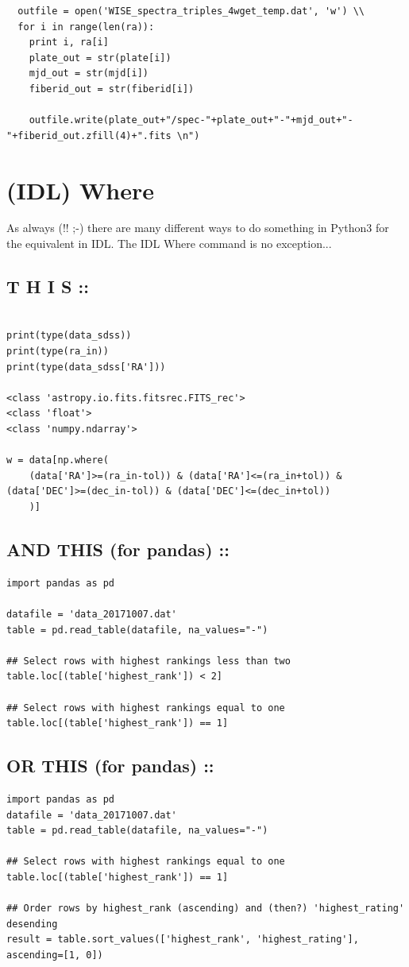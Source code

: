 \documentclass[11pt,a4paper]{article}
\begin{document}
\begin{lstlisting}
  outfile = open('WISE_spectra_triples_4wget_temp.dat', 'w') \\
  for i in range(len(ra)): 
    print i, ra[i] 
    plate_out = str(plate[i])
    mjd_out = str(mjd[i]) 
    fiberid_out = str(fiberid[i])

    outfile.write(plate_out+"/spec-"+plate_out+"-"+mjd_out+"-"+fiberid_out.zfill(4)+".fits \n")
\end{lstlisting}



\newpage
\section{(IDL) Where}
As always (!! ;-) there are many different ways to do something in
Python3 for the equivalent in IDL. The IDL Where command is no
exception...

\subsection{\bf  T H I S ::}
\begin{lstlisting}

print(type(data_sdss))
print(type(ra_in))
print(type(data_sdss['RA']))

<class 'astropy.io.fits.fitsrec.FITS_rec'>
<class 'float'>
<class 'numpy.ndarray'>

w = data[np.where(
    (data['RA']>=(ra_in-tol)) & (data['RA']<=(ra_in+tol)) & (data['DEC']>=(dec_in-tol)) & (data['DEC']<=(dec_in+tol))
    )]
\end{lstlisting}

\subsection{\bf  AND THIS  (for pandas)  ::}
\begin{lstlisting}
import pandas as pd

datafile = 'data_20171007.dat'
table = pd.read_table(datafile, na_values="-")

## Select rows with highest rankings less than two
table.loc[(table['highest_rank']) < 2]

## Select rows with highest rankings equal to one
table.loc[(table['highest_rank']) == 1]
\end{lstlisting}

\subsection{\bf  OR THIS (for pandas) ::}
\begin{lstlisting}
import pandas as pd
datafile = 'data_20171007.dat'
table = pd.read_table(datafile, na_values="-")

## Select rows with highest rankings equal to one
table.loc[(table['highest_rank']) == 1]

## Order rows by highest_rank (ascending) and (then?) 'highest_rating' desending 
result = table.sort_values(['highest_rank', 'highest_rating'], ascending=[1, 0])

\end{lstlisting}
\end{document}
